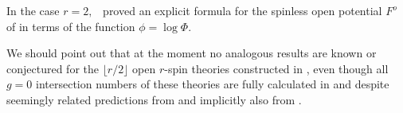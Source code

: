 \documentclass[11pt]{amsart}
\theoremstyle{definition}
\theoremstyle{remark}
\newcommand{\<}{\left<}
\renewcommand{\>}{\right>}
\numberwithin{equation}{section}
\begin{document}
In the case %
$r=2,$~\cite{Bur16} proved %
an explicit formula for the spinless open potential $F^o$ of \cite{PST14,Tes15} in terms of the function $\phi=\log\Phi$. 


We should point out that at the moment no analogous results are known or conjectured for the $\lfloor r/2\rfloor$ open $r$-spin theories constructed in \cite{TZ1,TZ2}, even though all $g=0$ intersection numbers of these theories are fully calculated %
in \cite{TZ2} and %
despite seemingly related predictions from \cite{Horiprivate} and implicitly also from \cite{Hori}.
\end{document}
